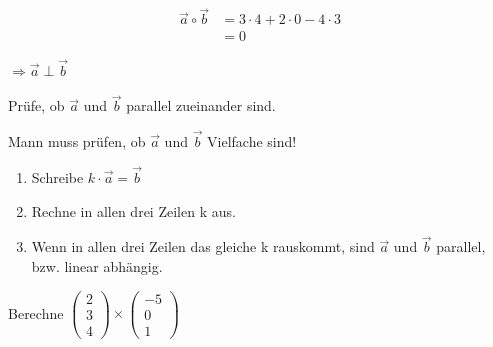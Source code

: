 \documentclass[paper=a6,ngerman,twoside=true,fontsize=14pt, parskip = half]{scrartcl}
\begin{document}
\begin{antwort}
	\begin{align*}
	\vec{a} \circ \vec{b} &= 3 \cdot 4 + 2 \cdot 0 -4\cdot 3 \\
	&= 0
	\end{align*}
	
	$\Rightarrow \vec{a} \perp \vec{b}$
	
\end{antwort}	
\begin{frage}
	Prüfe, ob $\vec{a}$ und  $\vec{b}$ 
	parallel zueinander sind.
\end{frage}
\begin{antwort}
	Mann muss prüfen, ob $\vec{a}$ und  $\vec{b}$ Vielfache sind!
	\begin{enumerate}
		\item Schreibe $k \cdot \vec{a}= \vec{b}$
		\item Rechne in allen drei Zeilen k aus.			
		\item Wenn in allen drei Zeilen das gleiche k rauskommt, sind $\vec{a}$ und $\vec{b}$ parallel, bzw. linear abhängig.	
	\end{enumerate}	
	
\end{antwort}	
\begin{frage}

	Berechne  $\left(\begin{array}{c} 2 \\ 3 \\ 4\end{array} \right) \times \left(\begin{array}{c} -5 \\ 0 \\ 1\end{array} \right)$ 
	
\end{frage}
\end{document}
